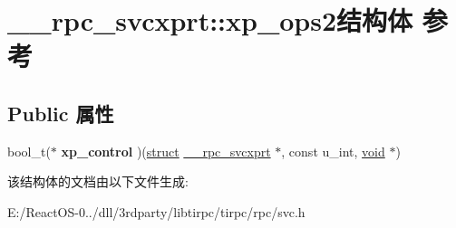 \hypertarget{struct____rpc__svcxprt_1_1xp__ops2}{}\section{\+\_\+\+\_\+rpc\+\_\+svcxprt\+:\+:xp\+\_\+ops2结构体 参考}
\label{struct____rpc__svcxprt_1_1xp__ops2}
\subsection*{Public 属性}
\begin{DoxyCompactItemize}
\item 
\mbox{\label{struct____rpc__svcxprt_1_1xp__ops2_a35f3142fd13dac41cac3bd93083c0716}} 
bool\+\_\+t($\ast$ {\bfseries xp\+\_\+control} )(\hyperlink{interfacestruct}{struct} \hyperlink{struct____rpc__svcxprt}{\+\_\+\+\_\+rpc\+\_\+svcxprt} $\ast$, const u\+\_\+int, \hyperlink{interfacevoid}{void} $\ast$)
\end{DoxyCompactItemize}


该结构体的文档由以下文件生成\+:\begin{DoxyCompactItemize}
\item 
E\+:/\+React\+O\+S-\/0../dll/3rdparty/libtirpc/tirpc/rpc/svc.\+h\end{DoxyCompactItemize}
